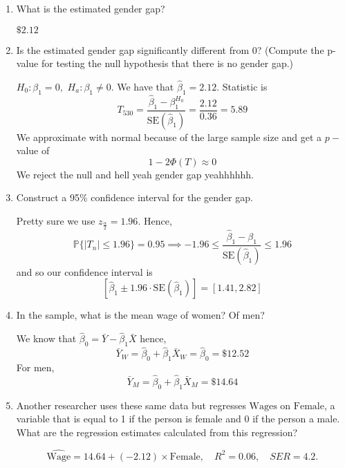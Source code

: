 \documentclass[11pt]{article}
\newcommand{\bbP}{\mathbb{P}}
\begin{document}
\begin{enumerate}
\begin{enumerate}
    \item What is the estimated gender gap?
    \begin{solution}
        $\$2.12$
    \end{solution}
    \item Is the estimated gender gap significantly different from 0? (Compute the p-value for testing the null hypothesis that there is no gender gap.)
    \begin{solution}
        $H_0: \beta_1 = 0,$ $H_a: \beta_1 \neq 0.$ We have that $\hat\beta_1 = 2.12.$ Statistic is 
        \[T_{530} = \frac{\hat \beta_1 - \beta_1^{H_0}}{\text{SE}(\hat\beta_1)} = \frac{2.12}{0.36} = 5.89\] We approximate with normal because of the large sample size and get a $p-$value of 
        \[1-2\Phi(T)\approx 0 \]We reject the null and hell yeah gender gap yeahhhhhh.
    \end{solution}
    \item Construct a 95\% confidence interval for the gender gap.
    \begin{solution}
        Pretty sure we use $z_{\frac{\alpha}{2}} = 1.96.$ Hence, 
        \[\bbP\{|T_n| \leq 1.96\} = 0.95 \implies -1.96 \leq \frac{\hat\beta_1 - \beta_1}{\text{SE}(\hat\beta_1)} \leq 1.96\] and so our confidence interval is 
        \[\left[\hat\beta_1 \pm 1.96 \cdot\text{SE}(\hat\beta_1)\right] = \left[1.41, 2.82\right]\]
    \end{solution}
    \item In the sample, what is the mean wage of women? Of men?
    \begin{solution}
        We know that $\hat\beta_0 = \bar Y - \hat\beta_1 \bar X$ hence, 
        \[\bar Y_W = \hat\beta_0 + \hat\beta_1\bar X_W = \hat\beta_0 = \$12.52\] For men, 
        \[\bar Y_M = \hat\beta_0 + \hat\beta_1 \bar X_M= \$14.64\]
    \end{solution}
    \item Another researcher uses these same data but regresses $\text{Wages}$ on $\text{Female}$, a variable that is equal to 1 if the person is female and 0 if the person a male. What are the regression estimates calculated from this regression?
    \begin{solution}
        $$\widehat{\text{Wage}} = 14.64 + (-2.12)\times \text{Female}, \quad R^2 = 0.06, \quad SER = 4.2.$$
    \end{solution}
\end{enumerate}

\end{enumerate}
\end{document}

